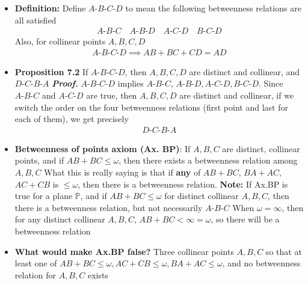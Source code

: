 \documentclass{report}
\begin{document}
\begin{itemize}
        \item \textbf{Definition:} Define $A\text{-}B\text{-}C\text{-}D$ to mean the following betweenness relations are all satisfied
            \begin{align*}
                A\text{-}B\text{-}C \quad A\text{-}B\text{-}D \quad A\text{-}C\text{-}D \quad B\text{-}C\text{-}D 
            \end{align*}
            \bigbreak \noindent 
            Also, for collinear points $A,B,C,D$
            \begin{align*}
                A\text{-}B\text{-}C\text{-}D \implies AB + BC + CD = AD
            \end{align*}
        \item \textbf{Proposition 7.2} If $A\text{-}B\text{-}C\text{-}D$, then $A,B,C,D$ are distinct and collinear, and $D\text{-}C\text{-}B\text{-}A $
            \bigbreak \noindent 
            \textbf{\textit{Proof.}} $A\text{-}B\text{-}C\text{-}D$ implies $ A\text{-}B\text{-}C$, $ A\text{-}B\text{-}D, A\text{-}C\text{-}D, B\text{-}C\text{-}D$. Since $ A\text{-}B\text{-}C$ and $ A\text{-}C\text{-}D$ are true, then $A,B,C,D$ are distinct and collinear, if we switch the order on the four betweenness relations (first point and last for each of them), we get precisely 
            \begin{align*}
                D\text{-}C\text{-}B\text{-}A
            \end{align*}
            \endpf
        \item \textbf{Betweenness of points axiom (Ax. BP)}: If $A,B,C$ are distinct, collinear points, and if $AB + BC \leq \omega$, then there exists a betweenness relation among $A,B,C$
            \bigbreak \noindent 
            What this is really saying is that if \textbf{any} of $AB + BC$, $BA + AC$, $AC + CB$ is $ \leq \omega$, then there is a betweenness relation.
            \bigbreak \noindent 
            \textbf{Note:} If Ax.BP is true for a plane $\mathbb{P}$, and if $AB + BC \leq \omega$ for distinct collinear $A,B,C$, then there is a betweenness relation, but not necessarily $ A\text{-}B\text{-}C $
            \bigbreak \noindent 
            When $\omega = \infty$, then for any distinct collinear $A,B,C$, $AB +BC  < \infty = \omega $, so there will be a betweenness relation
        \item \textbf{What would make Ax.BP false?} Three collinear points $A,B,C$ so that at least one of $AB + BC \leq \omega, AC + CB \leq \omega, BA + AC \leq \omega$, and no betweenness relation for $A,B,C$ exists

\end{itemize}
\end{document}
